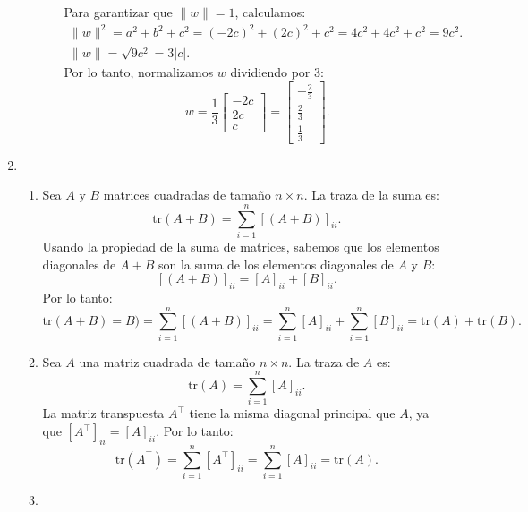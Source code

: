 \begin{enumerate}[label=\color{red}\textbf{\arabic*)}]
\begin{enumerate}[label=\arabic*)]
\begin{enumerate}[label=Paso \arabic*:]
         Para garantizar que  $\|w\|=1$, calculamos:  \[
             \begin{array}{c}
         \|w\|^2=a^2+b^2+c^2=(-2c)^2+(2c)^2+c^2=4c^2+4c^2+c^2=9c^2.\\
         \|w\|=\sqrt{9c^2}=3|c|. 
             \end{array}
         \] 
         Por lo tanto, normalizamos $w$ dividiendo por 3: \[
         w=\dfrac{1}{3}\begin{bmatrix} 
         -2c\\
         2c\\
         c
         \end{bmatrix} =\begin{bmatrix} 
         -\frac{2}{3} \\
         \frac{2}{3} \\
         \frac{1}{3} 
         \end{bmatrix}. 
         \] 
\end{enumerate}
    \end{enumerate}
\item {}
    \begin{enumerate}[label=\color{red}\textbf{\alph*)}]
        \item {} 

            Sea $A$ y  $B$ matrices cuadradas de tamaño $n\times n$. La traza de la suma es: \[
\mathrm{tr}(A+B)=\sum_{i=1}^{n}[(A+B)]_{ii}.
\]
Usando la propiedad de la suma de matrices, sabemos que los elementos diagonales de $A+B$ son la suma de los elementos diagonales de $A$ y $B$: \[[(A+B)]_{ii}=[A]_{ii}+[B]_{ii}.\]
Por lo tanto: \[
\mathrm{tr}(A+B)=B)=\sum_{i=1}^{n}[(A+B)]_{ii}=\sum_{i=1}^{n}[A]_{ii}+\sum_{i=1}^{n}[B]_{ii}=\mathrm{tr}(A)+\mathrm{tr}(B).
\]
        \item {} 

            Sea $A$ una matriz cuadrada de tamaño  $n\times n$. La traza de $A$ es:  \[
                \mathrm{tr}(A)=\sum_{i=1}^{n} [A]_{ii}.
            \] 
            La matriz transpuesta  $A^\intercal$ tiene la misma diagonal principal que $A$, ya que  $[A^\intercal]_{ii}=[A]_{ii}$. Por lo tanto: \[
                \mathrm{tr}(A^\intercal)=\sum_{i=1}^{n} [A^\intercal]_{ii}=\sum_{i=1}^{n} [A]_{ii}=\mathrm{tr}(A).
            \] 
        \item {} 


\end{enumerate}
\end{enumerate}
